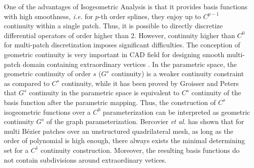 \documentclass[preprint,12pt]{elsarticle}
\theoremstyle{remark}
\begin{document}
One of the advantages of Isogeometric Analysis is that it provides basis functions with high smoothness, \textit{i.e.} for $p$-th order splines, they enjoy up to $C^{p-1}$ continuity within a single patch. Thus, it is possible to directly discretize differential operators of order higher than 2. However, continuity higher than $C^0$ for multi-patch discretization imposes significant difficulties. The conception of geometric continuity is very important in CAD field \cite{peters_chapter_2002} for designing smooth multi-patch domain containing extraordinary vertices \cite{peters_joining_1992}. In the parametric space, the geometric continuity of order $s$ ($G^s$ continuity) is a weaker continuity constraint as compared to $C^s$ continuity, while it has been proved by Groisser and Peters \cite{groisser_matched_2015} that $G^s$ continuity in the parametric space is equivalent to $C^s$ continuity of the basis function after the parametric mapping. Thus, the construction of $C^s$ isogeometric functions over a $C^0$ parameterization can be interpreted as geometric continuity $G^s$ of the graph parameterization. Bercovier \textit{et al.} \cite{bercovier_smooth_2014} has shown that for multi B\'ezier patches over an unstructured quadrilateral mesh, as long as the order of polynomial is high enough, there always exists the minimal determining set for a $C^1$ continuity construction. Moreover, the resulting basis functions do not contain subdivisions around extraordinary vetices.\par
\end{document}
